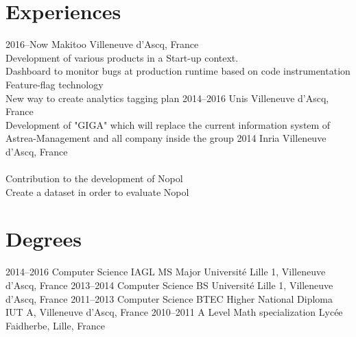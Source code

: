 \documentclass[hidelinks]{cv-style}          %
\begin{document}
\section{Experiences}
\begin{entrylist}
\entry
  {2016--Now}
  {Makitoo}
  {Villeneuve d'Ascq, France}
  {\\
  Development of various products in a Start-up context.\\
  Dashboard to monitor bugs at production runtime based on code instrumentation\\
  Feature-flag technology\\
  New way to create analytics tagging plan
}
\entry
  {2014--2016}
  {Unis}
  {Villeneuve d'Ascq, France}
  {\\
  Development of "GIGA" which will replace the current information system of Astrea-Management and all company inside the group
}
\entry
  {2014}
  {Inria}
  {Villeneuve d'Ascq, France}
  {\\
  \\
  Contribution to the development of Nopol\\
  Create a dataset in order to evaluate Nopol
}


\end{entrylist}
\leavevmode\newline



\section{Degrees}
\begin{entrylist}

\entry
{2014--2016}
{Computer Science IAGL MS {\normalfont Major}}
{Université Lille 1, Villeneuve d'Ascq, France}
{\vspace{-0.3cm}}
\entry
{2013--2014}
{Computer Science BS}
{Université Lille 1, Villeneuve d'Ascq, France}
{\vspace{-0.3cm}}
\entry
{2011--2013}
{Computer Science BTEC Higher National Diploma}
{IUT A, Villeneuve d'Ascq, France}
{\vspace{-0.3cm}}
\entry
{2010--2011}
{A Level {\normalfont Math specialization}}
{Lycée Faidherbe, Lille, France}
{\vspace{-0.3cm}}

\end{entrylist}
\leavevmode\newline
\end{document}
